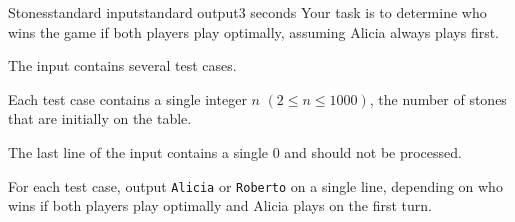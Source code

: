 \begin{problem}{Stones}{standard input}{standard output}{3 seconds}
Your task is to determine who wins the game if both players play optimally, assuming Alicia always plays first.

\InputFile

The input contains several test cases.

Each test case contains a single integer $n$ $(2 \leq n \leq 1000)$, the number of stones that are initially on the table.

The last line of the input contains a single $0$ and should not be processed.

\OutputFile

For each test case, output \texttt{Alicia} or \texttt{Roberto} on a single line, depending on who wins if both players play optimally and Alicia plays on the first turn.

\Example

\begin{example}
%
\end{example}

\end{problem}
